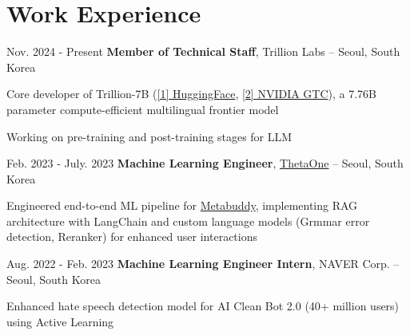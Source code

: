 \section{Work Experience}


\begin{twocolentry}{Nov. 2024 - Present}
\textbf{Member of Technical Staff}, Trillion Labs -- Seoul, South Korea
\end{twocolentry}

\vspace{0.10 cm}
\begin{onecolentry}
\begin{highlights}
\item Core developer of Trillion-7B (\href{https://huggingface.co/trillionlabs/Trillion-7B-preview}{[1] HuggingFace}, \href{https://www.nvidia.com/en-us/on-demand/session/gtc25-S73857/}{[2] NVIDIA GTC}), a 7.76B parameter compute-efficient multilingual frontier model
\item Working on pre-training and post-training stages for LLM
\end{highlights}
\end{onecolentry}
\vspace{0.20 cm}


\begin{twocolentry}{Feb. 2023 - July. 2023}
\textbf{Machine Learning Engineer}, \href{https://thetaone.co}{ThetaOne} -- Seoul, South Korea
\end{twocolentry}
\vspace{0.10 cm}
\begin{onecolentry}
\begin{highlights}
\item Engineered end-to-end ML pipeline for \href{https://thetaone.co/metabuddy}{Metabuddy}, implementing RAG architecture with LangChain and custom language models (Grmmar error detection, Reranker) for enhanced user interactions
\end{highlights}
\end{onecolentry}

\vspace{0.2 cm}
\vspace{0.2 cm}

\begin{twocolentry}{Aug. 2022 - Feb. 2023}
\textbf{Machine Learning Engineer Intern}, NAVER Corp. -- Seoul, South Korea
\end{twocolentry}
\vspace{0.10 cm}
\begin{onecolentry}
\begin{highlights}
\item Enhanced hate speech detection model for AI Clean Bot 2.0 (40+ million users) using Active Learning
\end{highlights}
\end{onecolentry}
